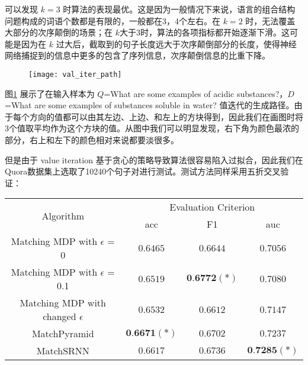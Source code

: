 可以发现 $k=3$ 时算法的表现最优。这是因为一般情况下来说，语言的组合结构问题构成的词语个数都是有限的，一般都在3，4个左右。在 $k=2$ 时，无法覆盖大部分的次序颠倒的场景；在 $k$大于3时，算法的各项指标都开始逐渐下滑。这可能是因为在 $k$ 过大后，截取到的句子长度远大于次序颠倒部分的长度，使得神经网络捕捉到的信息中更多的包含了序列信息，次序颠倒信息的比重下降。

\begin{figure}[H]
    \centering
    \texttt{[image: val\_iter\_path]}
    \label{fig:val_iter_path}
\end{figure}

图\ref{fig:val_iter_path} 展示了在输入样本为 $Q$=What are some examples of acidic substances?，$D$=What are some examples of substances soluble in water? 值迭代的生成路径。由于每个方向的值都可以由其左边、上边、和左上的方块得到，因此我们在画图时将3个值取平均作为这个方块的值。从图中我们可以明显发现，右下角为颜色最浓的部分，右上和左下的颜色相对来说都要淡很多。

但是由于 value iteration 基于贪心的策略导致算法很容易陷入过拟合，因此我们在Quora数据集上选取了10240个句子对进行测试。测试方法同样采用五折交叉验证：

\begin{table}[H]
    \label{tab:MDP_small_test}
    \centering
    \footnotesize%
    \setlength{\tabcolsep}{4pt}%
    \renewcommand{\arraystretch}{1.2}%
    \begin{tabular}{cccc}
        \hline
        \multirow{2}{*}{Algorithm} &
        \multicolumn{3}{c}{\multirow{1}{*}{Evaluation Criterion}} \\
        \cline{2-4} & acc & F1 & auc \\
        \hline
        Matching MDP with $\epsilon$ = 0 & $0.6465$ & $0.6644$ & $0.7056$ \\
        Matching MDP with $\epsilon$ = 0.1 & $0.6519$ & $\textbf{0.6772}(*)$ & $0.7080$ \\
        Matching MDP with changed $\epsilon$ & $0.6532$ & $0.6612$ & $0.7147$ \\
        \hline
        MatchPyramid & $\textbf{0.6671}(*)$ & $0.6702$ & $0.7237$ \\
        \hline
        MatchSRNN & $0.6617$ & $0.6736$ & $\textbf{0.7285}(*)$\\
        \hline
    \end{tabular}
\end{table}

